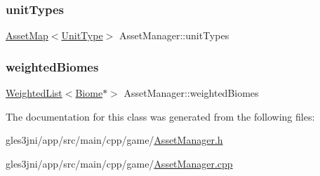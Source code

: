 \mbox{\label{class_asset_manager_ad9a5e153c6a6e8eabae3c5bfcb2357e3}} 
\subsubsection{\texorpdfstring{unit\+Types}{unitTypes}}
{\footnotesize\ttfamily \hyperlink{class_asset_manager_a67ef2a74c058b6cebefd838bcc3a7d96}{Asset\+Map}$<$\hyperlink{class_unit_type}{Unit\+Type}$>$ Asset\+Manager\+::unit\+Types\hspace{0.3cm}{\ttfamily [private]}}

\mbox{\label{class_asset_manager_adb9982a105cce102ebcf4a6cdc7644c2}} 
\subsubsection{\texorpdfstring{weighted\+Biomes}{weightedBiomes}}
{\footnotesize\ttfamily \hyperlink{class_weighted_list}{Weighted\+List}$<$\hyperlink{class_biome}{Biome}$\ast$$>$ Asset\+Manager\+::weighted\+Biomes\hspace{0.3cm}{\ttfamily [private]}}



The documentation for this class was generated from the following files\+:\begin{DoxyCompactItemize}
\item 
gles3jni/app/src/main/cpp/game/\hyperlink{_asset_manager_8h}{Asset\+Manager.\+h}\item 
gles3jni/app/src/main/cpp/game/\hyperlink{_asset_manager_8cpp}{Asset\+Manager.\+cpp}\end{DoxyCompactItemize}
